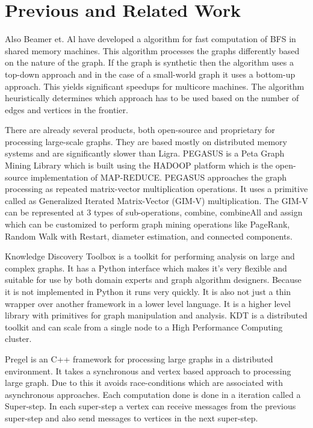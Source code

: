 \documentclass[a4paper,10pt,twoside]{article}
\begin{document}
\section{Previous and Related Work}

Also Beamer et. Al \cite{Beamer:2012:DBS:2388996.2389013} have developed a algorithm for fast computation of BFS in shared memory machines. This algorithm processes the graphs differently based on the nature of the graph. If the graph is synthetic then the algorithm uses a top-down approach and in the case of a small-world graph it uses a bottom-up approach. This yields significant speedups for multicore machines. The algorithm heuristically determines which approach has to be used based on the number of edges and vertices in the frontier.

	There are already several products, both open-source and proprietary for processing large-scale graphs. They are based mostly on distributed memory systems and are significantly slower than Ligra. 
PEGASUS \cite{Kang:2011:PMP:1971122.1971124} is a Peta Graph Mining Library which is built using the HADOOP platform which is the open-source implementation of MAP-REDUCE. PEGASUS approaches the graph processing as repeated matrix-vector multiplication operations. It uses a primitive called as Generalized Iterated Matrix-Vector (GIM-V)  multiplication. The GIM-V can be represented at 3 types of sub-operations, combine, combineAll and assign which can be customized to perform graph mining operations like PageRank, Random Walk with Restart, diameter estimation, and connected components.

	Knowledge Discovery Toolbox \cite{lugowski2012flexible} is a toolkit for performing analysis on large and complex graphs. It has a Python interface which makes it's very flexible and suitable for use by both domain experts and graph algorithm designers. Because it is not implemented in Python it runs very quickly. It is also not just a thin wrapper over another framework in a lower level language. It is a higher level library with primitives for graph manipulation and analysis. KDT is a distributed toolkit and can scale from a single node to a High Performance Computing cluster.

	Pregel \cite{Malewicz:2010:PSL:1807167.1807184} is an C++ framework for processing large graphs in a distributed environment. It takes a synchronous and vertex based approach to processing large graph. Due to this it avoids race-conditions which are associated with asynchronous approaches. Each computation done is done in a iteration called a Super-step. In each super-step a vertex can receive messages from the previous super-step and also send messages to vertices in the next super-step.
\end{document}
